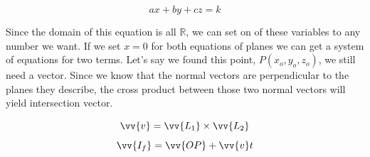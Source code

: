\begin{equation*}
	ax + by + cz = k 
\end{equation*}

Since the domain of this equation is all $\mathbb{R}$, we can set on of these variables to any number we want. If we set $x=0$ for both equations of planes we can get a system of equations for two terms. Let's say we found this point, $P(x_o,y_o,z_o)$, we still need a vector. Since we know that the normal vectors are perpendicular to the planes they describe, the cross product between those two normal vectors will yield intersection vector. 

\begin{equation*}
	\vv{v} = \vv{L_1} \times \vv{L_2}
\end{equation*}
\begin{equation*}
	\vv{I_f} = \vv{OP} + \vv{v}t 
\end{equation*}